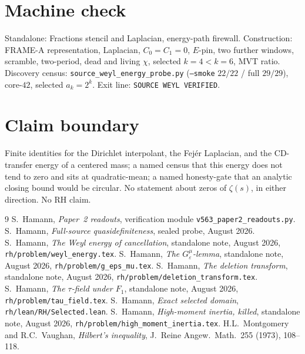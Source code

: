 \documentclass[11pt]{article}
\theoremstyle{remark}
\begin{document}
\section*{Machine check}

Standalone: Fractions stencil and Laplacian, energy-path
firewall.
Construction: FRAME-A representation, Laplacian, $C_0=C_1=0$,
$E$-pin, two further windows, scramble, two-period, dead and
living $\chi$, selected $k=4<k=6$, MVT ratio.
Discovery census: \texttt{source\_weyl\_energy\_probe.py}
(\texttt{--smoke} $22/22$ / full $29/29$), core-$42$,
selected $a_k=2^k$.
Exit line: \texttt{SOURCE WEYL VERIFIED}.

\section*{Claim boundary}

Finite identities for the Dirichlet interpolant, the Fej\'er
Laplacian, and the CD-transfer energy of a centered mass;
a named census that this energy does not tend to zero and
sits at quadratic-mean; a named honesty-gate that an
analytic closing bound would be circular.
No statement about zeros of $\zeta(s)$, in either direction.
No RH claim.

\begin{thebibliography}{9}
S.~Hamann,
\textit{Paper~2 readouts},
verification module \texttt{v563\_paper2\_readouts.py}.
S.~Hamann,
\textit{Full-source quasidefiniteness},
sealed probe, August 2026.
S.~Hamann,
\textit{The Weyl energy of cancellation},
standalone note, August 2026,
\texttt{rh/problem/weyl\_energy.tex}.
S.~Hamann,
\textit{The $G_\varepsilon^\mu$-lemma},
standalone note, August 2026,
\texttt{rh/problem/g\_eps\_mu.tex}.
S.~Hamann,
\textit{The deletion transform},
standalone note, August 2026,
\texttt{rh/problem/deletion\_transform.tex}.
S.~Hamann,
\textit{The $\tau$-field under $F_1$},
standalone note, August 2026,
\texttt{rh/problem/tau\_field.tex}.
S.~Hamann,
\textit{Exact selected domain},
\texttt{rh/lean/RH/Selected.lean}.
S.~Hamann,
\textit{High-moment inertia, killed},
standalone note, August 2026,
\texttt{rh/problem/high\_moment\_inertia.tex}.
H.L.~Montgomery and R.C.~Vaughan,
\textit{Hilbert's inequality},
J.~Reine Angew.\ Math.\ 255 (1973), 108--118.
\end{thebibliography}
\end{document}
